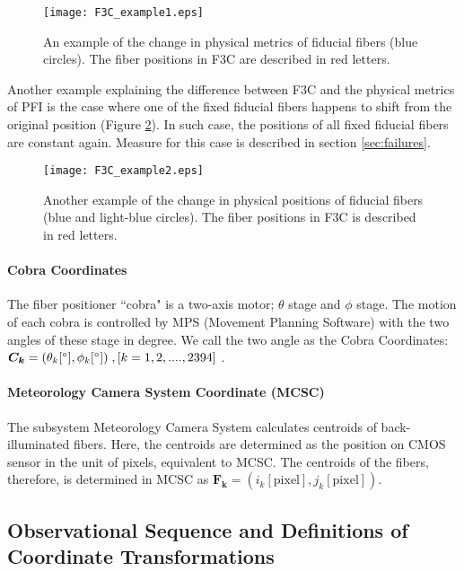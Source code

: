 \begin{figure}[!ht]
\begin{center}
\texttt{[image: F3C\_example1.eps]}
\end{center}
\caption{An example of the change in physical metrics of fiducial fibers (blue circles).
The fiber positions in F3C are described in red letters.
}
\label{fig:F3Cex1}
\end{figure}

Another example explaining the difference between F3C and the physical metrics of PFI is the case where one of the fixed fiducial fibers happens to shift from the original position (Figure \ref{fig:F3Cex2}).
In such case, the positions of all fixed fiducial fibers are constant again.
Measure for this case is described in section \ref{sec:failures}.

\begin{figure}[!ht]
\begin{center}
\texttt{[image: F3C\_example2.eps]}
\end{center}
\caption{Another example of the change in physical positions of fiducial fibers (blue and light-blue circles).
The fiber positions in F3C is described in red letters.
}
\label{fig:F3Cex2}
\end{figure}

\paragraph{Cobra Coordinates}
The fiber positioner ``cobra" is a two-axis motor; $\theta$ stage and $\phi$ stage.
The motion of each cobra is controlled by MPS (Movement Planning Software) with the two angles of these stage in degree.
We call the two angle as the Cobra Coordinates: $\bm{C_k}=(\theta _k [ ^\circ ], \phi _k [ ^\circ ])\;, [k=1,2,....,2394]$ .

\paragraph{Meteorology Camera System Coordinate (MCSC)}
The subsystem Meteorology Camera System calculates centroids of back-illuminated fibers.
Here, the centroids are determined as the position on CMOS sensor in the unit of pixels, equivalent to MCSC.
The centroids of the fibers, therefore, is determined in MCSC as $\bm{F_k}=(i_k [ \mathrm{pixel} ], j_k [ \mathrm{pixel} ])$.

\subsection{Observational Sequence and Definitions of Coordinate Transformations}\label{sec:ctsec}

